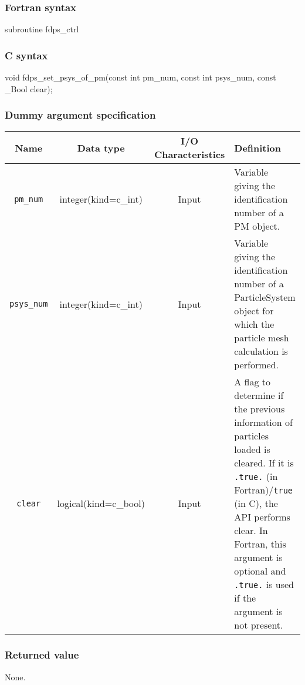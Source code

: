 \subsubsection*{Fortran syntax}
\begin{screen}
\begin{spverbatim}
subroutine fdps_ctrl%
\end{spverbatim}
\end{screen}

\subsubsection*{C syntax}
\begin{screen}
\begin{spverbatim}
void fdps_set_psys_of_pm(const int pm_num,
                         const int psys_num,
                         const _Bool clear);
\end{spverbatim}
\end{screen}


\subsubsection*{Dummy argument specification}
\begin{table}[h]
\begin{tabularx}{\linewidth}{cccX}
\toprule
\rowcolor{Snow2}
Name & Data type & I/O Characteristics & Definition \\
\midrule
\texttt{pm\_num} & integer(kind=c\_int) & Input & Variable giving the identification number of a PM object.\\
\texttt{psys\_num} & integer(kind=c\_int) & Input & Variable giving the identification number of a ParticleSystem object for which the particle mesh calculation is performed.\\
\texttt{clear} & logical(kind=c\_bool) & Input & A flag to determine if the previous information of particles loaded is cleared. If it is \texttt{.true.} {\small (in Fortran)}/\texttt{true} {\small (in C)}, the API performs clear. In Fortran, this argument is optional and \texttt{.true.} is used if the argument is not present.\\
\bottomrule
\end{tabularx}
\end{table}

\subsubsection*{Returned value}
None.

